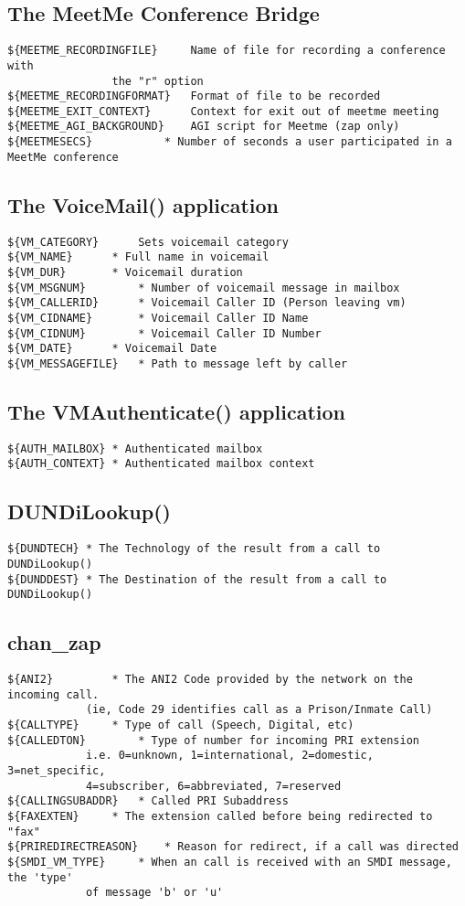\subsection{The MeetMe Conference Bridge}
\begin{verbatim}
${MEETME_RECORDINGFILE} 	Name of file for recording a conference with 
				the "r" option
${MEETME_RECORDINGFORMAT} 	Format of file to be recorded
${MEETME_EXIT_CONTEXT} 		Context for exit out of meetme meeting
${MEETME_AGI_BACKGROUND} 	AGI script for Meetme (zap only)
${MEETMESECS} 			* Number of seconds a user participated in a MeetMe conference
\end{verbatim}

\subsection{The VoiceMail() application}
\begin{verbatim}
${VM_CATEGORY}		Sets voicemail category
${VM_NAME}		* Full name in voicemail
${VM_DUR}		* Voicemail duration
${VM_MSGNUM}		* Number of voicemail message in mailbox
${VM_CALLERID}		* Voicemail Caller ID (Person leaving vm)
${VM_CIDNAME}		* Voicemail Caller ID Name
${VM_CIDNUM}		* Voicemail Caller ID Number
${VM_DATE}		* Voicemail Date
${VM_MESSAGEFILE}	* Path to message left by caller
\end{verbatim}

\subsection{The VMAuthenticate() application}
\begin{verbatim}
${AUTH_MAILBOX}	* Authenticated mailbox
${AUTH_CONTEXT}	* Authenticated mailbox context
\end{verbatim}

\subsection{DUNDiLookup()}
\begin{verbatim}
${DUNDTECH}	* The Technology of the result from a call to DUNDiLookup()
${DUNDDEST}	* The Destination of the result from a call to DUNDiLookup()
\end{verbatim}

\subsection{chan\_zap}
\begin{verbatim}
${ANI2}			* The ANI2 Code provided by the network on the incoming call. 
			(ie, Code 29 identifies call as a Prison/Inmate Call)
${CALLTYPE}		* Type of call (Speech, Digital, etc)
${CALLEDTON}		* Type of number for incoming PRI extension
			i.e. 0=unknown, 1=international, 2=domestic, 3=net_specific, 
			4=subscriber, 6=abbreviated, 7=reserved 
${CALLINGSUBADDR}	* Called PRI Subaddress
${FAXEXTEN}	 	* The extension called before being redirected to "fax"	
${PRIREDIRECTREASON}	* Reason for redirect, if a call was directed
${SMDI_VM_TYPE}		* When an call is received with an SMDI message, the 'type'
			of message 'b' or 'u'
\end{verbatim}

